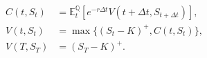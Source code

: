 \documentclass{equation-sheet}
\begin{document}
\begin{equation*}
\begin{aligned}
C(t,S_t)&=\mathbb{E}^{\mathbb{Q}}_t[
e^{-r\Delta t}V(t+\Delta t,S_{t+\Delta t})], \\
V(t,S_t)&=\max\{(S_t-K)^{+},C(t,S_t)\}, \\
V(T,S_T)&=(S_T-K)^{+}.
\end{aligned}
\end{equation*}
\end{document}
